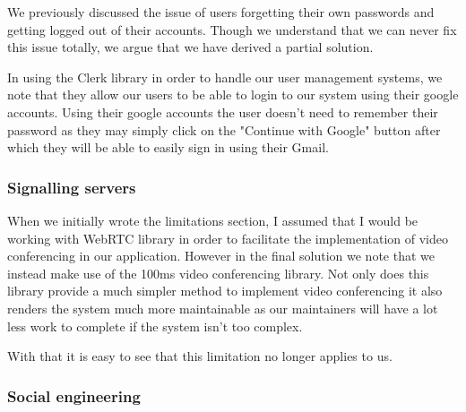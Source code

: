 We previously discussed the issue of users forgetting their own passwords and getting logged out of their accounts.
Though we understand that we can never fix this issue totally, we argue that we have derived a partial solution.
\\ \vspace{0.2cm}

In using the Clerk library in order to handle our user management systems, we note that they allow our users to be
able to login to our system using their google accounts. Using their google accounts the user doesn't need to remember
their password as they may simply click on the "Continue with Google" button after which they will be able to easily
sign in using their Gmail. \\ \vspace{0.2cm}

\subsubsection{Signalling servers}

When we initially wrote the limitations section, I assumed that I would be working with WebRTC library in order to
facilitate the implementation of video conferencing in our application. However in the final solution we note that we
instead make use of the 100ms video conferencing library. Not only does this library provide a much simpler method
to implement video conferencing it also renders the system much more maintainable as our maintainers will have a lot
less work to complete if the system isn't too complex. \\ \vspace{0.2cm}

With that it is easy to see that this limitation no longer applies to us.

\subsubsection{Social engineering}

